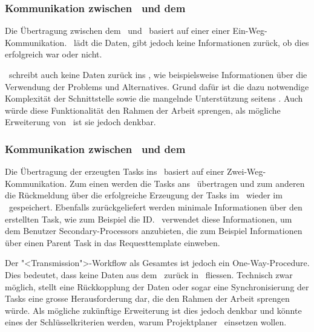 			\subsubsection{Kommunikation zwischen \eeppi\ und dem \dks}
				Die Übertragung zwischen dem \dks\ und \eeppi\ basiert auf einer einer Ein-Weg-Kommunikation.
				\eeppi\ lädt die Daten, gibt jedoch keine Informationen zurück, ob dies erfolgreich war oder nicht.
				
				\eeppi\ schreibt auch keine Daten zurück ins \dks, wie beispielsweise Informationen über die Verwendung der Problems und Alternatives.
				Grund dafür ist die dazu notwendige Komplexität der Schnittstelle sowie die mangelnde Unterstützung seitens \dks.
				Auch würde diese Funktionalität den Rahmen der Arbeit sprengen, als mögliche Erweiterung von \eeppi\ ist sie jedoch denkbar.
				
			
			\subsubsection{Kommunikation zwischen \eeppi\ und dem \ppt}
				Die Übertragung der erzeugten Tasks ins \ppt\ basiert auf einer Zwei-Weg-Kommunikation.
				Zum einen werden die Tasks ans \ppt\ übertragen
				und zum anderen die Rückmeldung über die erfolgreiche Erzeugung der Tasks im \ppt\ wieder im \eeppi\ gespeichert.
				Ebenfalls zurückgeliefert werden minimale Informationen über den erstellten Task, 
				wie zum Beispiel die ID. 
				\eeppi\ verwendet diese Informationen, um dem Benutzer Secondary-Processors anzubieten, die zum Beispiel Informationen über einen Parent Task in das Requesttemplate einweben.
				
				Der "<Transmission">-Workflow als Gesamtes ist jedoch ein One-Way-Procedure.
				Dies bedeutet, dass keine Daten aus dem \ppt\ zurück in \eeppi\ fliessen.
				Technisch zwar möglich, stellt eine Rückkopplung der Daten oder sogar eine Synchronisierung der Tasks eine grosse Herausforderung dar, 
				die den Rahmen der Arbeit sprengen würde.
				Als mögliche zukünftige Erweiterung ist dies jedoch denkbar und könnte eines
				der Schlüsselkriterien werden, warum Projektplaner \eeppi\ einsetzen wollen.